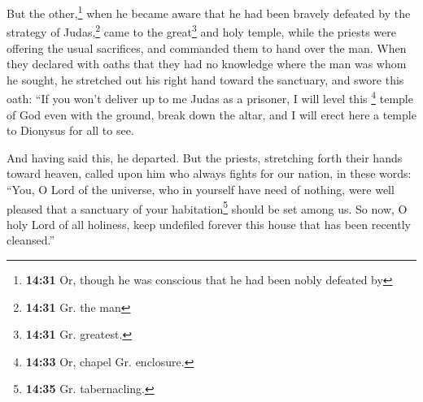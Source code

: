  But the other,\footnote{\textbf{14:31} Or, though he was
  conscious that he had been nobly defeated by} when he became aware
that he had been bravely defeated by the strategy of Judas,\footnote{\textbf{14:31}
  Gr. the man} came to the great\footnote{\textbf{14:31} Gr. greatest.}
and holy temple, while the priests were offering the usual sacrifices,
and commanded them to hand over the man.  When they
declared with oaths that they had no knowledge where the man was whom he
sought,  he stretched out his right hand toward the
sanctuary, and swore this oath: ``If you won't deliver up to me Judas as
a prisoner, I will level this \footnote{\textbf{14:33} Or, chapel Gr.
  enclosure.} temple of God even with the ground, break down the altar,
and I will erect here a temple to Dionysus for all to see.

 And having said this, he departed. But the priests,
stretching forth their hands toward heaven, called upon him who always
fights for our nation, in these words:  ``You, O Lord of
the universe, who in yourself have need of nothing, were well pleased
that a sanctuary of your habitation\footnote{\textbf{14:35} Gr.
  tabernacling.} should be set among us.  So now, O holy
Lord of all holiness, keep undefiled forever this house that has been
recently cleansed.''

